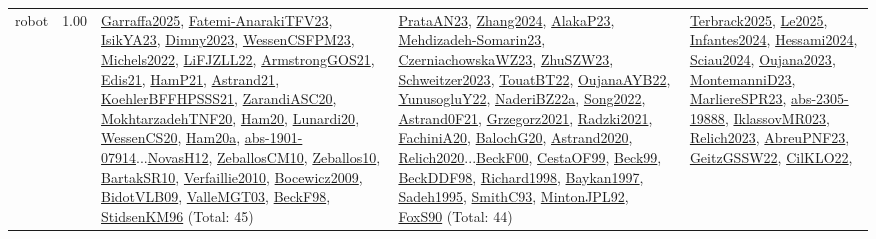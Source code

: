 {\begin{longtable}{p{3cm}r>{\raggedright\arraybackslash}p{6cm}>{\raggedright\arraybackslash}p{6cm}>{\raggedright\arraybackslash}p{8cm}}
\index{robot}\index{ApplicationAreas!robot}robot &  1.00 & \hyperref[detail:Garraffa2025]{Garraffa2025}, \hyperref[detail:Fatemi-AnarakiTFV23]{Fatemi-AnarakiTFV23}, \hyperref[detail:IsikYA23]{IsikYA23}, \hyperref[detail:Dimny2023]{Dimny2023}, \hyperref[detail:WessenCSFPM23]{WessenCSFPM23}, \hyperref[detail:Michels2022]{Michels2022}, \hyperref[detail:LiFJZLL22]{LiFJZLL22}, \hyperref[detail:ArmstrongGOS21]{ArmstrongGOS21}, \hyperref[detail:Edis21]{Edis21}, \hyperref[detail:HamP21]{HamP21}, \hyperref[detail:Astrand21]{Astrand21}, \hyperref[detail:KoehlerBFFHPSSS21]{KoehlerBFFHPSSS21}, \hyperref[detail:ZarandiASC20]{ZarandiASC20}, \hyperref[detail:MokhtarzadehTNF20]{MokhtarzadehTNF20}, \hyperref[detail:Ham20]{Ham20}, \hyperref[detail:Lunardi20]{Lunardi20}, \hyperref[detail:WessenCS20]{WessenCS20}, \hyperref[detail:Ham20a]{Ham20a}, \hyperref[detail:abs-1901-07914]{abs-1901-07914}...\hyperref[detail:NovasH12]{NovasH12}, \hyperref[detail:ZeballosCM10]{ZeballosCM10}, \hyperref[detail:Zeballos10]{Zeballos10}, \hyperref[detail:BartakSR10]{BartakSR10}, \hyperref[detail:Verfaillie2010]{Verfaillie2010}, \hyperref[detail:Bocewicz2009]{Bocewicz2009}, \hyperref[detail:BidotVLB09]{BidotVLB09}, \hyperref[detail:ValleMGT03]{ValleMGT03}, \hyperref[detail:BeckF98]{BeckF98}, \hyperref[detail:StidsenKM96]{StidsenKM96} (Total: 45) & \hyperref[detail:PrataAN23]{PrataAN23}, \hyperref[detail:Zhang2024]{Zhang2024}, \hyperref[detail:AlakaP23]{AlakaP23}, \hyperref[detail:Mehdizadeh-Somarin23]{Mehdizadeh-Somarin23}, \hyperref[detail:CzerniachowskaWZ23]{CzerniachowskaWZ23}, \hyperref[detail:ZhuSZW23]{ZhuSZW23}, \hyperref[detail:Schweitzer2023]{Schweitzer2023}, \hyperref[detail:TouatBT22]{TouatBT22}, \hyperref[detail:OujanaAYB22]{OujanaAYB22}, \hyperref[detail:YunusogluY22]{YunusogluY22}, \hyperref[detail:NaderiBZ22a]{NaderiBZ22a}, \hyperref[detail:Song2022]{Song2022}, \hyperref[detail:Astrand0F21]{Astrand0F21}, \hyperref[detail:Grzegorz2021]{Grzegorz2021}, \hyperref[detail:Radzki2021]{Radzki2021}, \hyperref[detail:FachiniA20]{FachiniA20}, \hyperref[detail:BalochG20]{BalochG20}, \hyperref[detail:Astrand2020]{Astrand2020}, \hyperref[detail:Relich2020]{Relich2020}...\hyperref[detail:BeckF00]{BeckF00}, \hyperref[detail:CestaOF99]{CestaOF99}, \hyperref[detail:Beck99]{Beck99}, \hyperref[detail:BeckDDF98]{BeckDDF98}, \hyperref[detail:Richard1998]{Richard1998}, \hyperref[detail:Baykan1997]{Baykan1997}, \hyperref[detail:Sadeh1995]{Sadeh1995}, \hyperref[detail:SmithC93]{SmithC93}, \hyperref[detail:MintonJPL92]{MintonJPL92}, \hyperref[detail:FoxS90]{FoxS90} (Total: 44) & \hyperref[detail:Terbrack2025]{Terbrack2025}, \hyperref[detail:Le2025]{Le2025}, \hyperref[detail:Infantes2024]{Infantes2024}, \hyperref[detail:Hessami2024]{Hessami2024}, \hyperref[detail:Sciau2024]{Sciau2024}, \hyperref[detail:Oujana2023]{Oujana2023}, \hyperref[detail:MontemanniD23]{MontemanniD23}, \hyperref[detail:MarliereSPR23]{MarliereSPR23}, \hyperref[detail:abs-2305-19888]{abs-2305-19888}, \hyperref[detail:IklassovMR023]{IklassovMR023}, \hyperref[detail:Relich2023]{Relich2023}, \hyperref[detail:AbreuPNF23]{AbreuPNF23}, \hyperref[detail:GeitzGSSW22]{GeitzGSSW22}, \hyperref[detail:CilKLO22]{CilKLO22}, 
\end{longtable}}
